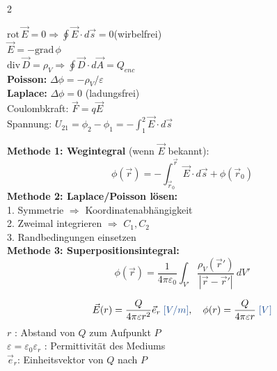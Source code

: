 \documentclass[a4paper, 7.5pt]{extarticle}
\begin{document}
\begin{multicols*}{2}
\begin{tcolorbox}[title={Grundgleichungen Elektrostatik}]
$\text{rot}\,\vec{E} = 0 \Rightarrow \oint\vec{E}\cdot d\vec{s} = 0$\quad (wirbelfrei)\\
$\vec{E} = -\text{grad}\,\phi$\quad \;\text{\textcolor{boxtitle}{[\(V/m\)]}}\\
$\text{div}\,\vec{D} = \rho_V \Rightarrow \oint\vec{D}\cdot d\vec{A} = Q_{enc}$\\
\textbf{Poisson:} $\Delta\phi = -\rho_V/\varepsilon$\quad \;\text{\textcolor{boxtitle}{[\(V/m^2\)]}}\\
\textbf{Laplace:} $\Delta\phi = 0$ (ladungsfrei)\\
Coulombkraft: $\vec{F} = q\vec{E}$ \;\text{\textcolor{boxtitle}{[\(N\)]}}\\
Spannung: $U_{21} = \phi_2-\phi_1 = -\int_1^2\vec{E}\cdot d\vec{s}$ \;\text{\textcolor{boxtitle}{[\(V\)]}}
\end{tcolorbox}

\begin{tcolorbox}[title={Potentialberechnung -- 3 Methoden}]
\textbf{Methode 1: Wegintegral} (wenn $\vec{E}$ bekannt):
$$\phi(\vec{r}) = -\int_{\vec{r}_0}^{\vec{r}}\vec{E}\cdot d\vec{s} + \phi(\vec{r}_0)$$
\textbf{Methode 2: Laplace/Poisson lösen:}\\
\phantom{x}1. Symmetrie $\Rightarrow$ Koordinatenabhängigkeit\\
\phantom{x}2. Zweimal integrieren $\Rightarrow$ $C_1, C_2$\\
\phantom{x}3. Randbedingungen einsetzen\\[3pt]
\textbf{Methode 3: Superpositionsintegral:}
$$\phi(\vec{r}) = \frac{1}{4\pi\varepsilon_0}\int_{V'}\frac{\rho_V(\vec{r}')}{|\vec{r}-\vec{r}'|}\,dV'$$
\end{tcolorbox}

\begin{tcolorbox}[title={Punktladung}]
\begin{center}
\end{center}
$$\vec{E}(r) = \frac{Q}{4\pi\varepsilon r^2}\vec{e}_r \;\text{\textcolor{boxtitle}{[\(V/m\)]}},\quad \phi(r) = \frac{Q}{4\pi\varepsilon r} \;\text{\textcolor{boxtitle}{[\(V\)]}}$$
$r$ \;\text{\textcolor{boxtitle}{[\(m\)]}}: Abstand von $Q$ zum Aufpunkt $P$\\
$\varepsilon = \varepsilon_0\varepsilon_r$ \;\text{\textcolor{boxtitle}{[\(As/(Vm)\)]}}: Permittivität des Mediums\\
$\vec{e}_r$: Einheitsvektor von $Q$ nach $P$
\end{tcolorbox}


\end{multicols*}
\end{document}
